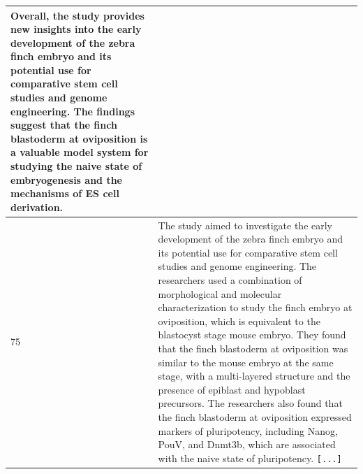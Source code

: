 \begin{table}[]
\begin{tabular}{l|p{}}
Overall, the study provides new insights into the early development of the zebra finch embryo and its potential use for comparative stem cell studies and genome engineering. The findings suggest that the finch blastoderm at oviposition is a valuable model system for studying the naive state of embryogenesis and the mechanisms of ES cell derivation. \\ \hline
75 & The study aimed to investigate the early development of the zebra finch embryo and its potential use for comparative stem cell studies and genome engineering. The researchers used a combination of morphological and molecular characterization to study the finch embryo at oviposition, which is equivalent to the blastocyst stage mouse embryo. They found that the finch blastoderm at oviposition was similar to the mouse embryo at the same stage, with a multi-layered structure and the presence of epiblast and hypoblast precursors.  The researchers also found that the finch blastoderm at oviposition expressed markers of pluripotency, including Nanog, PouV, and Dnmt3b, which are associated with the naive state of pluripotency. \texttt{[...]}

\end{tabular}
\end{table}

